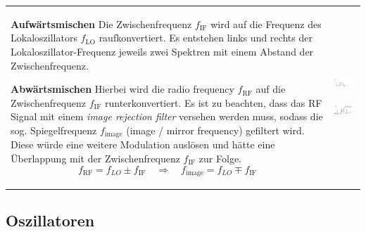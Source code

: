\begin{tabular}{ll} 
\parbox{9cm}{
	\textbf{Aufwärtsmischen}    \\
	Die Zwischenfrequenz $f_{\text{IF}}$ wird auf die Frequenz des
	Lokaloszillators $f_{\text{LO}}$ raufkonvertiert. 
	Es entstehen links und rechts
	der Lokaloszillator-Frequenz jeweils zwei Spektren mit einem Abstand der Zwischenfrequenz. \\ \\
	
	\textbf{Abwärtsmischen} \\
	Hierbei wird die radio frequency $f_{\text{RF}}$ auf die Zwischenfrequenz 
	$f_{\text{IF}}$ runterkonvertiert.
	Es ist zu beachten, dass das RF Signal mit einem \textit{image rejection
	filter} versehen werden muss, sodass die sog. Spiegelfrequenz $f_{\text{image}}$ (image
	/ mirror frequency) gefiltert wird. Diese würde eine weitere Modulation
    auslösen und hätte eine Überlappung mit der Zwischenfrequenz
    $f_{\text{IF}}$ zur Folge.
    $$ f_{\text{RF}} = f_{LO} \pm f_{\text{IF}}  \quad
    \Longrightarrow \quad f_{\text{image}} = f_{LO} \mp f_{\text{IF}} $$ } &
    \parbox{9cm}{ \includegraphics[width=9cm]{./bilder/components_mixer_spectrum.png} \\ \\
    \includegraphics[width=9cm]{./bilder/components_mixer_image-frequency.png}}
    \\
\end{tabular}


\subsection{Oszillatoren }

